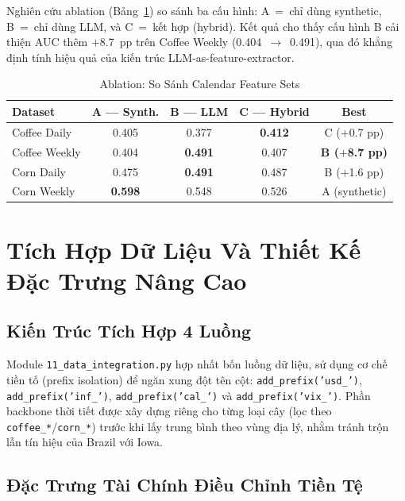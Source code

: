 \documentclass[conference]{IEEEtran}
\begin{document}
Nghiên cứu ablation (Bảng~\ref{tab:llm_ablation}) so sánh ba cấu hình:
A~=~chỉ dùng synthetic, B~=~chỉ dùng LLM, và C~=~kết hợp (hybrid). Kết quả cho
thấy cấu hình B cải thiện AUC thêm $+$8.7~pp trên Coffee Weekly
(0.404~$\to$~0.491), qua đó khẳng định tính hiệu quả của kiến trúc
LLM-as-feature-extractor.

\begin{table}[t]
\caption{Ablation: So Sánh Calendar Feature Sets}
\label{tab:llm_ablation}
\centering
\begin{tabular}{@{}lcccc@{}}
\toprule
\textbf{Dataset} & \textbf{A — Synth.} & \textbf{B — LLM} & \textbf{C — Hybrid} & \textbf{Best} \\
\midrule
Coffee Daily  & 0.405 & 0.377 & \textbf{0.412} & C ($+$0.7 pp) \\
Coffee Weekly & 0.404 & \textbf{0.491} & 0.407 & \textbf{B ($+$8.7 pp)} \\
Corn Daily    & 0.475 & \textbf{0.491} & 0.487 & B ($+$1.6 pp) \\
Corn Weekly   & \textbf{0.598} & 0.548 & 0.526 & A (synthetic) \\
\bottomrule
\end{tabular}
\end{table}

\section{Tích Hợp Dữ Liệu Và Thiết Kế Đặc Trưng Nâng Cao}

\subsection{Kiến Trúc Tích Hợp 4 Luồng}

Module \texttt{11\_data\_integration.py} hợp nhất bốn luồng dữ liệu, sử dụng
cơ chế tiền tố (prefix isolation) để ngăn xung đột tên cột:
\texttt{add\_prefix('usd\_')}, \texttt{add\_prefix('inf\_')},
\texttt{add\_prefix('cal\_')} và \texttt{add\_prefix('vix\_')}. Phần backbone
thời tiết được xây dựng riêng cho từng loại cây (lọc theo
\texttt{coffee\_*}/\texttt{corn\_*}) trước khi lấy trung bình theo vùng địa
lý, nhằm tránh trộn lẫn tín hiệu của Brazil với Iowa.

\subsection{Đặc Trưng Tài Chính Điều Chỉnh Tiền Tệ}
\end{document}

